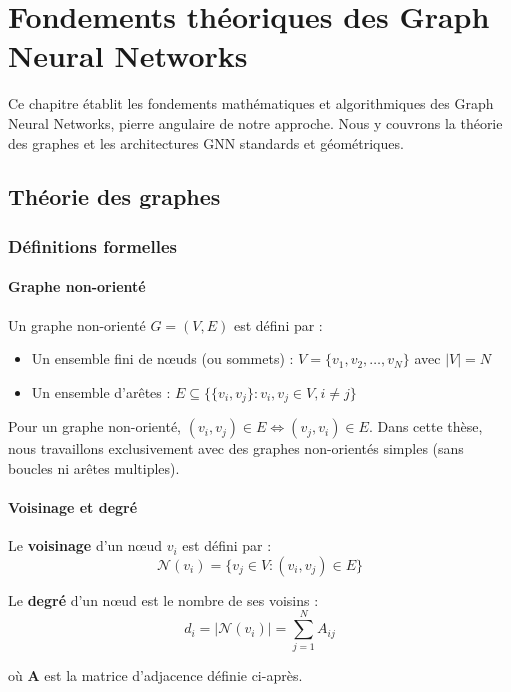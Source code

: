 
\chapter{Fondements théoriques des Graph Neural Networks}

Ce chapitre établit les fondements mathématiques et algorithmiques des Graph Neural Networks, pierre angulaire de notre approche. Nous y couvrons la théorie des graphes et les architectures GNN standards et géométriques.

\section{Théorie des graphes}

\subsection{Définitions formelles}

\subsubsection{Graphe non-orienté}

Un graphe non-orienté $G = (V, E)$ est défini par :
\begin{itemize}
    \item Un ensemble fini de nœuds (ou sommets) : $V = \{v_1, v_2, \ldots, v_N\}$ avec $|V| = N$
    \item Un ensemble d'arêtes : $E \subseteq \{\{v_i, v_j\} : v_i, v_j \in V, i \neq j\}$
\end{itemize}

Pour un graphe non-orienté, $(v_i, v_j) \in E \Leftrightarrow (v_j, v_i) \in E$. Dans cette thèse, nous travaillons exclusivement avec des graphes non-orientés simples (sans boucles ni arêtes multiples).

\subsubsection{Voisinage et degré}

Le \textbf{voisinage} d'un nœud $v_i$ est défini par :
\[
\mathcal{N}(v_i) = \{v_j \in V : (v_i, v_j) \in E\}
\]

Le \textbf{degré} d'un nœud est le nombre de ses voisins :
\[
d_i = |\mathcal{N}(v_i)| = \sum_{j=1}^N A_{ij}
\]

où $\mathbf{A}$ est la matrice d'adjacence définie ci-après.

